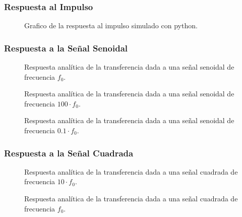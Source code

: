 \documentclass[10pt,a4paper]{article}
\begin{document}
    \subsubsection{Respuesta al Impulso}
    \begin{figure}[H]
        \centering
        \scalebox{0.85}{}
        \caption{Grafico de la respuesta al impulso simulado con python.}
        \label{fig}
    \end{figure}

    \subsubsection{Respuesta a la Señal Senoidal}
    \begin{figure}[H]
        \centering
        \scalebox{0.85}{}
        \caption{Respuesta analítica de la transferencia dada a una señal senoidal de frecuencia $f_0$.}
        \label{fig}
    \end{figure}

    \begin{figure}[H]
        \centering
        \scalebox{0.85}{}
        \caption{Respuesta analítica de la transferencia dada a una señal senoidal de frecuencia $100 \cdot f_0$.}
        \label{fig}
    \end{figure}

    \begin{figure}[H]
        \centering
        \scalebox{0.9}{}
        \caption{Respuesta analítica de la transferencia dada a una señal senoidal de frecuencia $0.1 \cdot f_0$.}
        \label{fig}
    \end{figure}


    \subsubsection{Respuesta a la Señal Cuadrada}

    \begin{figure}[H]
        \centering
        \scalebox{0.9}{}
        \caption{Respuesta analítica de la transferencia dada a una señal cuadrada de frecuencia $10 \cdot f_0$.}
        \label{fig}
    \end{figure}

    \begin{figure}[H]
        \centering
        \scalebox{0.9}{}
        \caption{Respuesta analítica de la transferencia dada a una señal cuadrada de frecuencia $f_0$.}
        \label{fig}
    \end{figure}
\end{document}
